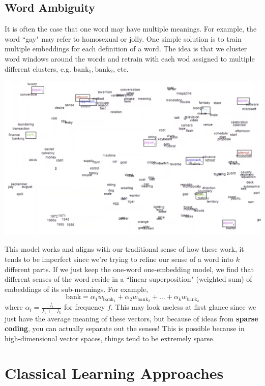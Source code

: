 \documentclass{article}
\begin{document}
  \subsection{Word Ambiguity}

    It is often the case that one word may have multiple meanings. For example, the word ``gay" may refer to homosexual or jolly. One simple solution is to train multiple embeddings for each definition of a word. The idea is that we cluster word windows around the words and retrain with each wod assigned to multiple different clusters, e.g. $\mathrm{bank}_1, \mathrm{bank}_2$, etc. 
    \begin{center}
        \includegraphics[scale=0.35]{img/ambiguity1.png}
    \end{center}
    This model works and aligns with our traditional sense of how these work, it tends to be imperfect since we're trying to refine our sense of a word into $k$ different parts. If we just keep the one-word one-embedding model, we find that different senses of the word reside in a ``linear superposition" (weighted sum) of embeddings of its sub-meanings. For example, 
    \[\text{bank} = \alpha_1 w_{\text{bank}_1} + \alpha_2 w_{\text{bank}_2} + \ldots + \alpha_k w_{\text{bank}_k}\]
    where $\alpha_i = \frac{f_i}{f_1 + \ldots f_k}$ for frequency $f$. This may look useless at first glance since we just have the average meaning of these vectors, but because of ideas from \textbf{sparse coding}, you can actually separate out the senses! This is possible because in high-dimensional vector spaces, things tend to be extremely sparse. 

\section{Classical Learning Approaches}
\end{document}
